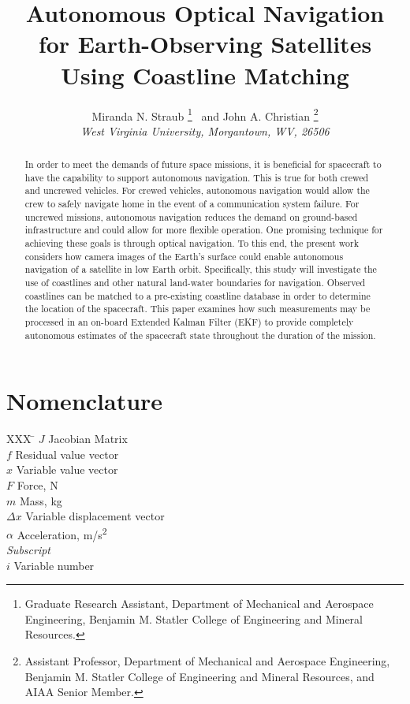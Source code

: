 \documentclass[]{aiaa-tc}%
\title{Autonomous Optical Navigation for Earth-Observing Satellites Using Coastline Matching}
\author{
  Miranda N. Straub%
    \thanks{Graduate Research Assistant, Department of Mechanical and Aerospace Engineering, Benjamin M. Statler College of Engineering and Mineral Resources.}
  \ and John A. Christian%
	\thanks{Assistant Professor, Department of Mechanical and Aerospace Engineering, Benjamin M. Statler College of Engineering and Mineral Resources, and AIAA Senior Member.}\\
  {\normalsize\itshape
  West Virginia University, Morgantown, WV, 26506}
 }
\begin{document}
\maketitle

\begin{abstract}
In order to meet the demands of future space missions, it is beneficial for spacecraft to have the capability to support autonomous navigation. This is true for both crewed and uncrewed vehicles. For crewed vehicles, autonomous navigation would allow the crew to safely navigate home in the event of a communication system failure. For uncrewed missions, autonomous navigation reduces the demand on ground-based infrastructure and could allow for more flexible operation. One promising technique for achieving these goals is through optical navigation. To this end, the present work considers how camera images of the Earth's surface could enable autonomous navigation of a satellite in low Earth orbit. Specifically, this study will investigate the use of coastlines and other natural land-water boundaries for navigation. Observed coastlines can be matched to a pre-existing coastline database in order to determine the location of the spacecraft. This paper examines how such measurements may be processed in an on-board Extended Kalman Filter (EKF) to provide completely autonomous estimates of the spacecraft state throughout the duration of the mission.
\end{abstract}

\section*{Nomenclature}

\begin{tabbing}
  XXX \= \kill%
  $J$ \> Jacobian Matrix \\
  $f$ \> Residual value vector \\
  $x$ \> Variable value vector \\
  $F$ \> Force, N \\
  $m$ \> Mass, kg \\
  $\Delta x$ \> Variable displacement vector \\
  $\alpha$ \> Acceleration, m/s\textsuperscript{2} \\[5pt]
  \textit{Subscript}\\
  $i$ \> Variable number \\
 \end{tabbing}

\end{document}
